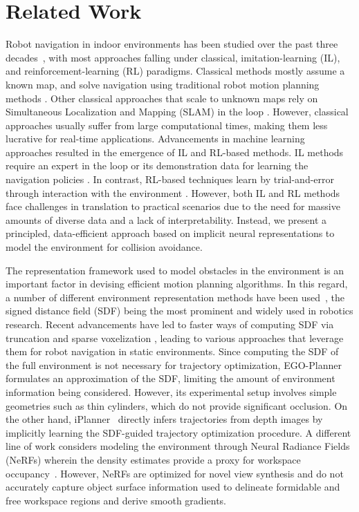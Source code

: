 \section{Related Work}
Robot navigation in indoor environments has been studied over the past three decades~\cite{desouza2002vision, cox1991blanche}, with most approaches falling under classical, imitation-learning (IL), and reinforcement-learning (RL) paradigms.
Classical methods mostly assume a known map, and solve navigation using traditional robot motion planning methods \cite{burgard1999experiences, thrun1999minerva, karaman2011sampling}.
Other classical approaches that scale to unknown maps rely on Simultaneous Localization and Mapping (SLAM) in the loop \cite{jones2011visual, chaplot2020learning, zhan2022activermap}.
However, classical approaches usually suffer from large computational times, making them less lucrative for real-time applications.
Advancements in machine learning approaches resulted in the emergence of IL and RL-based methods. 
IL methods require an expert in the loop or its demonstration data for learning the navigation policies \cite{gupta2017cognitive, finn2017one, stepputtis2020language}.
In contrast, RL-based techniques learn by trial-and-error through interaction with the environment \cite{zhu2017target, mirowski2016learning, ye2021auxiliary}.
However, both IL and RL methods face challenges in translation to practical scenarios due to the need for massive amounts of diverse data and a lack of interpretability.
Instead, we present a principled, data-efficient approach based on implicit neural representations to model the environment for collision avoidance.

The representation framework used to model obstacles in the environment is an important factor in devising efficient motion planning algorithms.
In this regard, a number of different environment representation methods have been used~\cite{oleynikova2016signed, mildenhall2021nerf, nfomp2022, ni2022ntfields}, the signed distance field (SDF) being the most prominent and widely used in robotics research.
Recent advancements have led to faster ways of computing SDF via truncation and sparse voxelization \cite{pan2022voxfield, oleynikova2017voxblox, han2019fiesta}, leading to various approaches that leverage them for robot navigation in static environments.
Since computing the SDF of the full environment is not necessary for trajectory optimization, EGO-Planner \cite{zhou2020ego} formulates an approximation of the SDF, limiting the amount of environment information being considered.
However, its experimental setup involves simple geometries such as thin cylinders, which do not provide significant occlusion.
On the other hand, iPlanner~\cite{yang2023iplanner} directly infers trajectories from depth images by implicitly learning the SDF-guided trajectory optimization procedure.
A different line of work considers modeling the environment through Neural Radiance Fields (NeRFs) wherein the density estimates provide a proxy for workspace occupancy~\cite{adamkiewicz2022vision}.
However, NeRFs are optimized for novel view synthesis and do not accurately capture object surface information used to delineate formidable and free workspace regions and derive smooth gradients.

